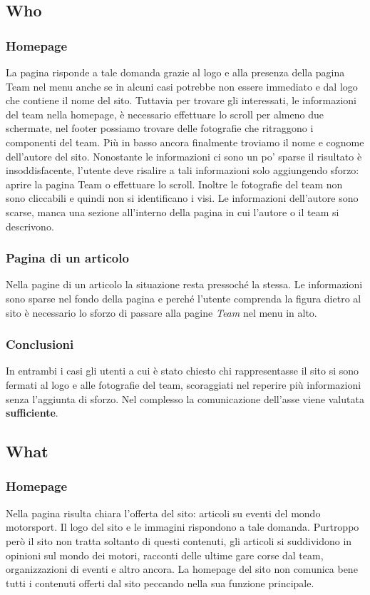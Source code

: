 	\subsection{Who}
		
		
		\subsubsection{Homepage}
			La pagina risponde a tale domanda grazie al logo e alla presenza della pagina Team nel menu anche se in alcuni casi potrebbe non essere immediato e dal logo che contiene il nome del sito. Tuttavia per trovare gli interessati, le informazioni del team nella homepage, è necessario effettuare lo scroll per almeno due schermate, nel footer possiamo trovare delle fotografie che ritraggono i componenti del team. Più in basso ancora finalmente troviamo il nome e cognome dell'autore del sito. Nonostante le informazioni ci sono un po' sparse il risultato è insoddisfacente, l'utente deve risalire a tali informazioni solo aggiungendo sforzo: aprire la pagina Team o effettuare lo scroll. Inoltre le fotografie del team non sono cliccabili e quindi non si identificano i visi. Le informazioni dell'autore sono scarse, manca una sezione all'interno della pagina in cui l'autore o il team si descrivono.
		
		\subsubsection{Pagina di un articolo}
			Nella pagine di un articolo la situazione resta pressoché la stessa. Le informazioni sono sparse nel fondo della pagina e perché l'utente comprenda la figura dietro al sito è necessario lo sforzo di passare alla pagine \textit{Team} nel menu in alto.
			
		\subsubsection{Conclusioni}
			In entrambi i casi gli utenti a cui è stato chiesto chi rappresentasse il sito si sono fermati al logo e alle fotografie del team, scoraggiati nel reperire più informazioni senza l'aggiunta di sforzo. Nel complesso la comunicazione dell'asse viene valutata \textbf{sufficiente}.
	

	\subsection{What}
		
		\subsubsection{Homepage}
			Nella pagina risulta chiara l'offerta del sito: articoli su eventi del mondo motorsport. Il logo del sito e le immagini rispondono a tale domanda. Purtroppo però il sito non tratta soltanto di questi contenuti, gli articoli si suddividono in opinioni sul mondo dei motori, racconti delle ultime gare corse dal team, organizzazioni di eventi e altro ancora. La homepage del sito non comunica bene tutti i contenuti offerti dal sito peccando nella sua funzione principale.
		
